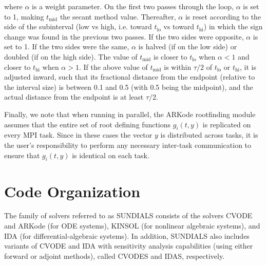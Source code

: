 \documentclass[letterpaper,10pt,english]{sphinxmanual}
\begin{document}
where $\alpha$ is a weight parameter. On the first two passes
through the loop, $\alpha$ is set to 1, making $t_\text{mid}$
the secant method value. Thereafter, $\alpha$ is reset according
to the side of the subinterval (low vs high, i.e. toward
$t_\text{lo}$ vs toward $t_\text{hi}$) in which the sign change was
found in the previous two passes. If the two sides were opposite,
$\alpha$ is set to 1. If the two sides were the same, $\alpha$
is halved (if on the low side) or doubled (if on the high side). The
value of $t_\text{mid}$ is closer to $t_\text{lo}$ when
$\alpha < 1$ and closer to $t_\text{hi}$ when $\alpha > 1$.
If the above value of $t_\text{mid}$ is within $\tau /2$ of
$t_\text{lo}$ or $t_\text{hi}$, it is adjusted inward, such that its
fractional distance from the endpoint (relative to the interval size)
is between 0.1 and 0.5 (with 0.5 being the midpoint), and the actual
distance from the endpoint is at least $\tau/2$.

Finally, we note that when running in parallel, the ARKode rootfinding
module assumes that the entire set of root defining functions
$g_i(t,y)$ is replicated on every MPI task.  Since in these
cases the vector $y$ is distributed across tasks, it is the
user's responsibility to perform any necessary inter-task
communication to ensure that $g_i(t,y)$ is identical on each task.


\chapter{Code Organization}
\label{Organization:organization}\label{Organization::doc}\label{Organization:code-organization}
The family of solvers referred to as SUNDIALS consists of the solvers
CVODE and ARKode (for ODE systems), KINSOL (for nonlinear algebraic
systems), and IDA (for differential-algebraic systems).  In addition,
SUNDIALS also includes variants of CVODE and IDA with sensitivity analysis
capabilities (using either forward or adjoint methods), called CVODES and
IDAS, respectively.
\end{document}
